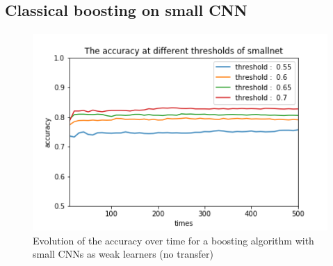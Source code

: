 \documentclass[11 pt]{article}
\begin{document}
\subsection{Classical boosting on small CNN}
\paragraph{}

\begin{figure}[H]
\begin{center}
\centerline{\includegraphics[width=\textwidth]{smallnet.png}}
\caption{Evolution of the accuracy over time for a boosting algorithm with small CNNs as weak learners (no transfer)}
\label{fig:smallNet}
\end{center}
\end{figure}
\end{document}
